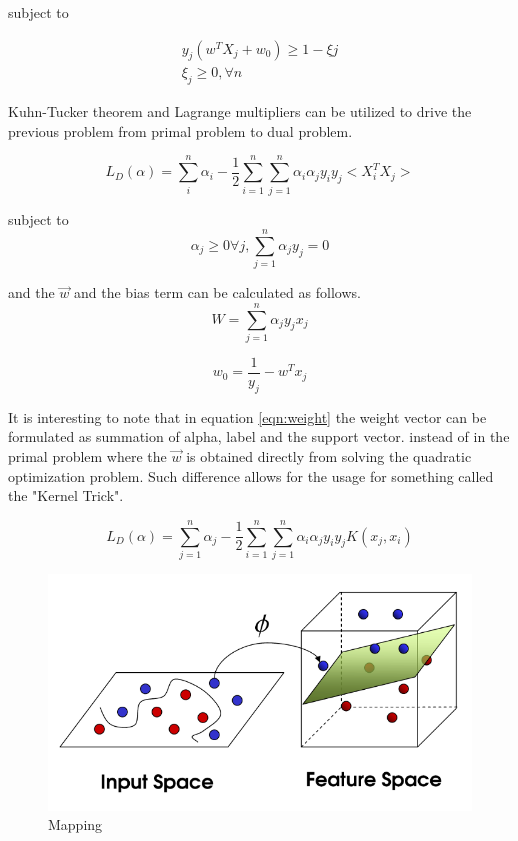 \documentclass[10pt,twocolumn,letterpaper]{article}
\begin{document}
subject to 

\begin{equation}
\begin{aligned}y_{j}\left( w^{T}X_{j}+w_{0}\right) \geq 1-\xi j\\
\xi _{j}\geq 0,\forall n\end{aligned}
\end{equation}


Kuhn-Tucker theorem and Lagrange multipliers can be utilized to drive the previous problem from primal problem to dual problem. 

\begin{equation}
L_{D}\left( \alpha \right) =\sum ^{n}_{i}\alpha _{i}-\dfrac{1}{2}\sum ^{n}_{i=1}\sum ^{n}_{j=1}\alpha _{i}\alpha _{j}y_{i}y_{j} <X_{i}^{T}X_{j} >
\label{eqn:l}
\end{equation}

subject to 
\begin{equation}
\alpha _{j}\geq 0\forall j,\sum ^{n}_{j=1}\alpha _{j}y_{j}=0
\end{equation}

and the $\overrightarrow{w}$ and the bias term can be calculated as follows. 
\begin{equation}
W=\sum ^{n}_{j=1}\alpha _{j}y_{j}x_{j}
\label{eqn:weight}
\end{equation}

\begin{equation}
w_{0}=\dfrac{1}{y_{j}}-w^{T}x_{j}
\end{equation}
 
It is interesting to note that in equation \ref{eqn:weight} the weight vector can be formulated as summation of alpha, label and the support vector. instead of in the primal problem where the $\overrightarrow{w}$ is obtained directly from solving the quadratic optimization problem. Such difference allows for the usage for something called the "Kernel Trick".
 
\begin{equation}
L_{D}\left( \alpha \right) =\sum ^{n}_{j=1}\alpha _{j}-\dfrac{1}{2}\sum ^{n}_{i=1}\sum ^{n}_{j=1}\alpha _{i}\alpha _{j}y_{i}y_{j}K\left( x_{j},x_{i}\right) 
\label{eqn:lk}
\end{equation} 


\begin{figure}[h!]
  \includegraphics[width=\linewidth]{kernel.png}
  \caption{Mapping}
  \label{fig:kernel}
\end{figure}
\end{document}
